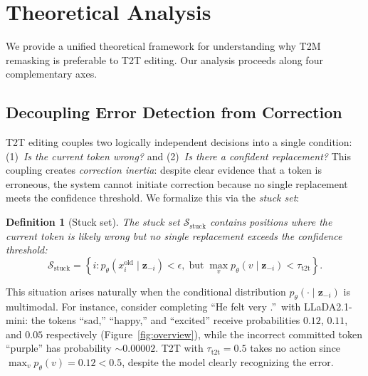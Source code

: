 \documentclass{article}
\newtheorem{definition}{Definition}
\newcommand{\TtoT}{\textrm{T2T}}
\newcommand{\TtoM}{\textrm{T2M}}
\newcommand{\Sstuck}{\mathcal{S}_{\mathrm{stuck}}}
\newcommand{\xold}{x_i^{\mathrm{old}}}
\begin{document}
\section{Theoretical Analysis}
\label{sec:theory}

We provide a unified theoretical framework for understanding why \TtoM{} remasking is preferable to \TtoT{} editing. Our analysis proceeds along four complementary axes.

\subsection{Decoupling Error Detection from Correction}

\TtoT{} editing couples two logically independent decisions into a single condition: (1)~\emph{Is the current token wrong?} and (2)~\emph{Is there a confident replacement?} This coupling creates \emph{correction inertia}: despite clear evidence that a token is erroneous, the system cannot initiate correction because no single replacement meets the confidence threshold. We formalize this via the \emph{stuck set}:

\begin{definition}[Stuck set]
The stuck set $\Sstuck$ contains positions where the current token is likely wrong but no single replacement exceeds the confidence threshold:
\begin{equation}
    \Sstuck = \left\{i : p_\theta(\xold \mid \mathbf{z}_{-i}) < \epsilon, \;\text{but}\; \max_v p_\theta(v \mid \mathbf{z}_{-i}) < \tau_{\text{t2t}}\right\}.
    \label{eq:stuck}
\end{equation}
\end{definition}

\noindent This situation arises naturally when the conditional distribution $p_\theta(\cdot \mid \mathbf{z}_{-i})$ is multimodal. For instance, consider completing ``He felt very \underline{\hspace{1cm}}.''\ with LLaDA2.1-mini: the tokens ``sad,'' ``happy,'' and ``excited'' receive probabilities $0.12$, $0.11$, and $0.05$ respectively (Figure~\ref{fig:overview}), while the incorrect committed token ``purple'' has probability ${\sim}0.00002$. \TtoT{} with $\tau_{\text{t2t}} = 0.5$ takes no action since $\max_v p_\theta(v) = 0.12 < 0.5$, despite the model clearly recognizing the error.
\end{document}
